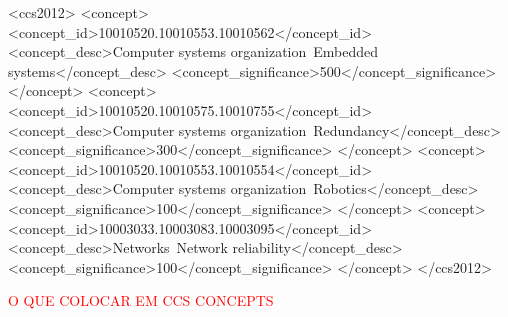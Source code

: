 \documentclass[sigconf]{acmart}
\begin{document}
\begin{CCSXML}
<ccs2012>
 <concept>
  <concept_id>10010520.10010553.10010562</concept_id>
  <concept_desc>Computer systems organization~Embedded systems</concept_desc>
  <concept_significance>500</concept_significance>
 </concept>
 <concept>
  <concept_id>10010520.10010575.10010755</concept_id>
  <concept_desc>Computer systems organization~Redundancy</concept_desc>
  <concept_significance>300</concept_significance>
 </concept>
 <concept>
  <concept_id>10010520.10010553.10010554</concept_id>
  <concept_desc>Computer systems organization~Robotics</concept_desc>
  <concept_significance>100</concept_significance>
 </concept>
 <concept>
  <concept_id>10003033.10003083.10003095</concept_id>
  <concept_desc>Networks~Network reliability</concept_desc>
  <concept_significance>100</concept_significance>
 </concept>
</ccs2012>
\end{CCSXML}




\maketitle

\textcolor{red}{O QUE COLOCAR EM CCS CONCEPTS}


  











\end{document}
